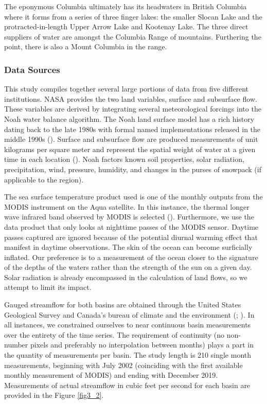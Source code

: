 \begin{refsection}
The eponymous Columbia ultimately has its headwaters in British Columbia where it forms from a series of three finger lakes: the smaller Slocan Lake and the protracted-in-length Upper Arrow Lake and Kootenay Lake. The three direct suppliers of water are amongst the Columbia Range of mountains. Furthering the point, there is also a Mount Columbia in the range.

\subsubsection{Data Sources}
This study compiles together several large portions of data from five different institutions. NASA provides the two land variables, surface and subsurface flow. These variables are derived by integrating several meteorological forcings into the Noah water balance algorithm. The Noah land surface model has a rich history dating back to the late 1980s with formal named implementations released in the middle 1990s (\cite{ek2003implementation}). Surface and subsurface flow are produced measurements of unit kilograms per square meter and represent the spatial weight of water at a given time in each location (\cite{xia2012comparative}). Noah factors known soil properties, solar radiation, precipitation, wind, pressure, humidity, and changes in the purses of snowpack (if applicable to the region). 

The sea surface temperature product used is one of the monthly outputs from the MODIS instrument on the Aqua satellite. In this instance, the thermal longer wave infrared band observed by MODIS is selected (\cite{nasaYears}). Furthermore, we use the data product that only looks at nighttime passes of the MODIS sensor. Daytime passes captured are ignored because of the potential diurnal warming effect that manifest in daytime observations. The skin of the ocean can become surficially inflated. Our preference is to a measurement of the ocean closer to the signature of the depths of the waters rather than the strength of the sun on a given day. Solar radiation is already encompassed in the calculation of land flows, so we attempt to limit its impact. 

Gauged streamflow for both basins are obtained through the United States Geological Survey and Canada’s bureau of climate and the environment (\cite{usgs2016national}; \cite{ecRealTimeHydrometric}). In all instances, we constrained ourselves to near continuous basin measurements over the entirety of the time series. The requirement of continuity (no non-number pixels and preferably no interpolation between months) plays a part in the quantity of measurements per basin. The study length is 210 single month measurements, beginning with July 2002 (coinciding with the first available monthly measurement of MODIS) and ending with December 2019. Measurements of actual streamflow in cubic feet per second for each basin are provided in the Figure \ref{fig3_2}.


\end{refsection}
